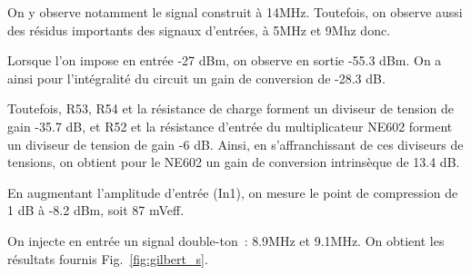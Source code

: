 \documentclass{article}
\begin{document}
On y observe notamment le signal construit à 14MHz. Toutefois, on observe aussi des résidus importants des signaux d'entrées, à 5MHz et 9Mhz donc.



Lorsque l'on impose en entrée -27 dBm, on observe en sortie -55.3 dBm. On a ainsi pour l'intégralité du circuit un gain de conversion de -28.3 dB.

Toutefois, R53, R54 et la résistance de charge forment un diviseur de tension de gain -35.7 dB, et R52 et la résistance d'entrée du multiplicateur NE602 forment un diviseur de tension de gain -6 dB. Ainsi, en s'affranchissant de ces diviseurs de tensions, on obtient pour le NE602 un gain de conversion intrinsèque de 13.4 dB.




En augmentant l'amplitude d'entrée (In1), on mesure le point de compression de 1 dB à -8.2 dBm, soit 87 mVeff.





On injecte en entrée un signal double-ton~: 8.9MHz et 9.1MHz. On obtient les résultats fournis Fig.~\ref{fig:gilbert_s}.
\end{document}
